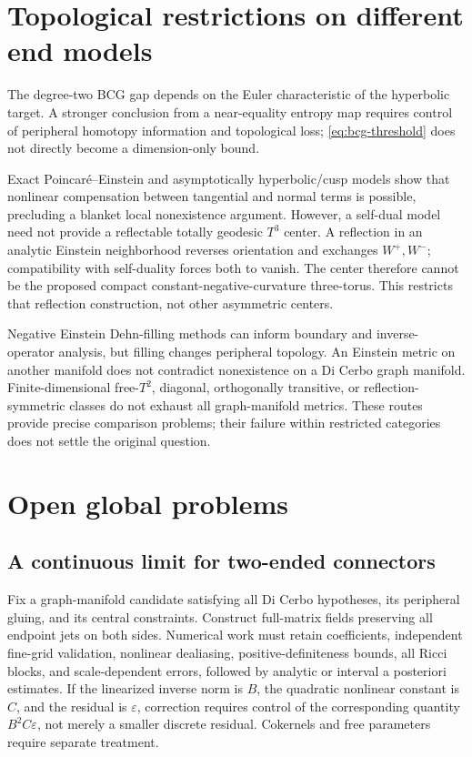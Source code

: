 \documentclass[a4paper,11pt]{article}
\numberwithin{equation}{section}
\theoremstyle{definition}
\begin{document}
\section{Topological restrictions on different end models}
The degree-two BCG gap depends on the Euler characteristic of the hyperbolic target.
A stronger conclusion from a near-equality entropy map requires control of peripheral homotopy information and topological loss; \eqref{eq:bcg-threshold} does not directly become a dimension-only bound.

Exact Poincar\'e--Einstein and asymptotically hyperbolic/cusp models show that nonlinear compensation between tangential and normal terms is possible, precluding a blanket local nonexistence argument.
However, a self-dual model need not provide a reflectable totally geodesic $T^3$ center.
A reflection in an analytic Einstein neighborhood reverses orientation and exchanges $W^+,W^-$; compatibility with self-duality forces both to vanish.
The center therefore cannot be the proposed compact constant-negative-curvature three-torus.
This restricts that reflection construction, not other asymmetric centers.

Negative Einstein Dehn-filling methods can inform boundary and inverse-operator analysis, but filling changes peripheral topology.
An Einstein metric on another manifold does not contradict nonexistence on a Di Cerbo graph manifold.
Finite-dimensional free-$T^2$, diagonal, orthogonally transitive, or reflection-symmetric classes do not exhaust all graph-manifold metrics.
These routes provide precise comparison problems; their failure within restricted categories does not settle the original question.

\section{Open global problems}
\subsection{A continuous limit for two-ended connectors}
Fix a graph-manifold candidate satisfying all Di Cerbo hypotheses, its peripheral gluing, and its central constraints.
Construct full-matrix fields preserving all endpoint jets on both sides.
Numerical work must retain coefficients, independent fine-grid validation, nonlinear dealiasing, positive-definiteness bounds, all Ricci blocks, and scale-dependent errors, followed by analytic or interval a posteriori estimates.
If the linearized inverse norm is $B$, the quadratic nonlinear constant is $C$, and the residual is $\varepsilon$, correction requires control of the corresponding quantity $B^2C\varepsilon$, not merely a smaller discrete residual.
Cokernels and free parameters require separate treatment.
\end{document}
